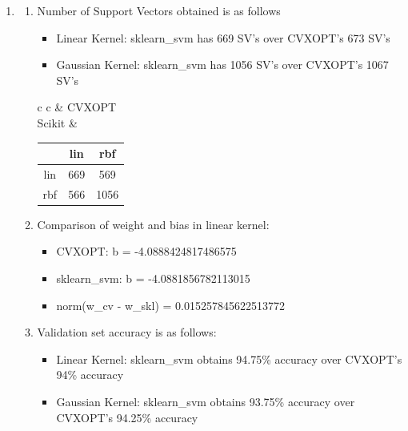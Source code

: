 \documentclass[12pt]{article}
\begin{document}
\begin{enumerate}[label=(\alph*)]
    \item \begin{enumerate}[label=\roman*.]
        \item Number of Support Vectors obtained is as follows
        \begin{itemize}
            \item Linear Kernel: sklearn\_svm has 669 SV's over CVXOPT's 673 SV's
            \item Gaussian Kernel: sklearn\_svm has 1056 SV's over CVXOPT's 1067 SV's
        \end{itemize}
        \begin{center}
            \begin{tabular}{c c}
                & CVXOPT \\
                Scikit & 
            \begin{tabular}{c|c|c|}
                    & lin  & rbf  \\   
                \hline
                lin & 669 & 569 \\
                \hline
                rbf & 566 & 1056 \\
                \hline
            \end{tabular}
            \end{tabular}
        \end{center}

    \item Comparison of weight and bias in linear kernel:
    \begin{itemize}
        \item CVXOPT: b = -4.0888424817486575
        \item sklearn\_svm: b = -4.0881856782113015
        \item norm(w\_cv - w\_skl) = 0.015257845622513772
    \end{itemize}
    \item Validation set accuracy is as follows:
    \begin{itemize}
        \item Linear Kernel: sklearn\_svm obtains 94.75\% accuracy over CVXOPT's 94\% accuracy
        \item Gaussian Kernel: sklearn\_svm obtains 93.75\% accuracy over CVXOPT's 94.25\% accuracy
    \end{itemize}


\end{enumerate}
\end{enumerate}
\end{document}
